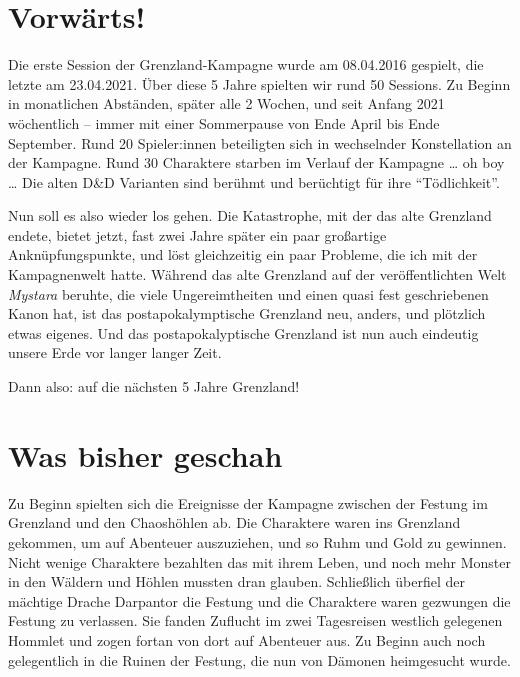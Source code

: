 \documentclass[11pt]{wbzine}
\begin{document}
\begin{multicols}{2}

\section{Vorwärts!}

Die erste Session der Grenzland-Kampagne wurde am 08.04.2016
    gespielt, die letzte am 23.04.2021. Über diese 5 Jahre spielten
    wir rund 50 Sessions. Zu Beginn in monatlichen Abständen, später
    alle 2 Wochen, und seit Anfang 2021 wöchentlich – immer mit
    einer Sommerpause von Ende April bis Ende September. Rund 20
    Spieler:innen beteiligten sich in wechselnder Konstellation an
    der Kampagne. Rund 30 Charaktere starben im Verlauf der Kampagne
    … oh boy … Die alten D\&D Varianten sind berühmt und berüchtigt
    für ihre ``Tödlichkeit''.

Nun soll es also wieder los gehen. Die Katastrophe, mit der das alte
    Grenzland endete, bietet jetzt, fast zwei Jahre später ein paar
    großartige Anknüpfungspunkte, und löst gleichzeitig ein paar
    Probleme, die ich mit der Kampagnenwelt hatte. Während das alte
    Grenzland auf der veröffentlichten Welt \textit{Mystara}
    beruhte, die viele Ungereimtheiten und einen quasi fest
    geschriebenen Kanon hat, ist das postapokalymptische Grenzland
    neu, anders, und plötzlich etwas eigenes. Und das
    postapokalyptische Grenzland ist nun auch eindeutig unsere Erde
    vor langer langer Zeit. 


Dann also: auf die nächsten 5 Jahre Grenzland!

\section{Was bisher geschah}

Zu Beginn spielten sich die Ereignisse der Kampagne zwischen der
    Festung im Grenzland und den Chaoshöhlen ab. Die Charaktere
    waren ins Grenzland gekommen, um auf Abenteuer auszuziehen, und
    so Ruhm und Gold zu gewinnen. Nicht wenige Charaktere bezahlten
    das mit ihrem Leben, und noch mehr Monster in den Wäldern und
    Höhlen mussten dran glauben. Schließlich überfiel der mächtige
    Drache Darpantor die Festung und die Charaktere waren gezwungen
    die Festung zu verlassen. Sie fanden Zuflucht im zwei
    Tagesreisen westlich gelegenen Hommlet und zogen fortan von dort
    auf Abenteuer aus. Zu Beginn auch noch gelegentlich in die
    Ruinen der Festung, die nun von Dämonen heimgesucht wurde.


\end{multicols}
\end{document}
